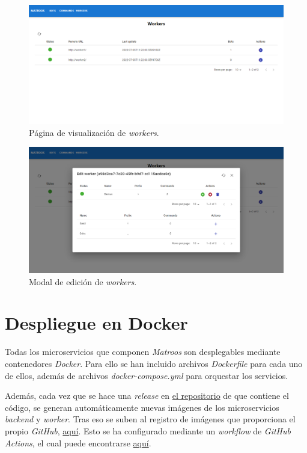 \begin{figure}[H]
	\centering
	\includegraphics[width=1\textwidth]{img/front/page-workers.png}
	\caption{Página de visualización de \textit{workers}.}
\end{figure}

\begin{figure}[H]
	\centering
	\includegraphics[width=1\textwidth]{img/front/page-workers-edit.png}
	\caption{Modal de edición de \textit{workers}.}
\end{figure}

\section{Despliegue en Docker}

Todas los microservicios que componen \textit{Matroos} son desplegables mediante contenedores \textit{Docker}. Para ello se han incluido archivos \textit{Dockerfile} para cada uno de ellos, además de archivos \textit{docker-compose.yml} para orquestar los servicios.

Además, cada vez que se hace una \textit{release} en \href{https://github.com/harvestcore/matroos}{el repositorio} de que contiene el código, se generan automáticamente nuevas imágenes de los microservicios \textit{backend} y \textit{worker}. Tras eso se suben al registro de imágenes que proporciona el propio \textit{GitHub}, \href{https://github.com/harvestcore?tab=packages&repo_name=matroos}{aquí}. Esto se ha configurado mediante un \textit{workflow} de \textit{GitHub Actions}, el cual puede encontrarse \href{https://github.com/harvestcore/matroos/blob/develop/.github/workflows/build-docker-images.yml}{aquí}.

